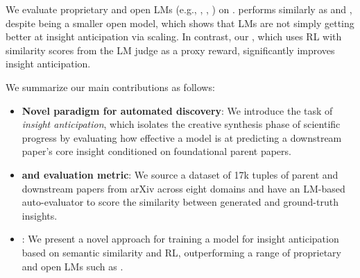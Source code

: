 We evaluate proprietary and open LMs (e.g., \gemtwopro{}, \gemthreepro{}, \qwenfourb{})
on \ourbenchmark{}. \qwenfourb{} performs similarly as \gemtwopro{} and \gemthreepro{}, despite being a smaller open model, which shows that LMs are not simply getting better at insight anticipation via scaling. In contrast, our \ourmethod{}, which uses RL with similarity scores from the LM judge as a proxy reward, significantly improves insight anticipation. 

We summarize our main contributions as follows:
\begin{itemize}
    \item \textbf{Novel paradigm for automated discovery}: We introduce the task of \emph{insight anticipation}, which isolates the creative synthesis phase of scientific progress by evaluating how effective a model is at predicting a downstream paper's core insight conditioned on foundational parent papers.
    \item \textbf{\ourbenchmark{} and evaluation metric}: We source a dataset of 17k tuples of parent and downstream papers from arXiv across eight domains and have an LM-based auto-evaluator to score the similarity between generated and ground-truth insights.
    \item \textbf{\ourmethod{}}: We present a novel approach for training a model for insight anticipation based on semantic similarity and RL, outperforming a range of proprietary and open LMs such as \gemthreepro{}.
\end{itemize}





